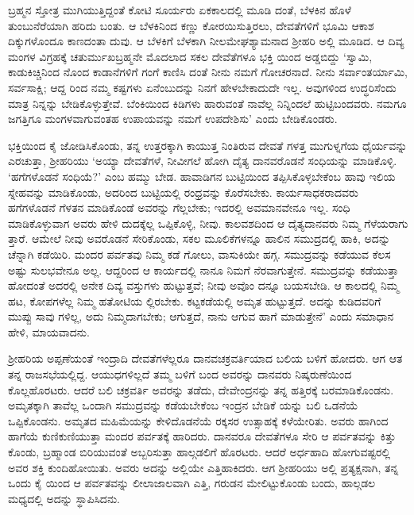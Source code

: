 ಬ್ರಹ್ಮನ ಸ್ತೋತ್ರ ಮುಗಿಯುತ್ತಿದ್ದಂತೆ ಕೋಟಿ ಸೂರ್ಯರು ಏಕಕಾಲದಲ್ಲಿ ಮೂಡಿ ದಂತೆ, ಬೆಳಕಿನ ಹೊಳೆ ತುಂಬುನೆರೆಯಾಗಿ ಹರಿದು ಬಂತು. ಆ ಬೆಳಕಿನಿಂದ ಕಣ್ಣು ಕೋರಯಿಸುತ್ತಿರಲು, ದೇವತೆಗಳಿಗೆ ಭೂಮಿ ಆಕಾಶ ದಿಕ್ಕುಗಳೊಂದೂ ಕಾಣದಂತಾ ದುವು. ಆ ಬೆಳಕಿಗೆ ಬೆಳಕಾಗಿ ನೀಲಮೇಘಶ್ಯಾಮನಾದ ಶ್ರೀಹರಿ ಅಲ್ಲಿ ಮೂಡಿದ. ಆ ದಿವ್ಯ ಮಂಗಳ ವಿಗ್ರಹಕ್ಕೆ ಚತುರ್ಮುಖಬ್ರಹ್ಮನೇ ಮೊದಲಾದ ಸಕಲ ದೇವೆತೆಗಳೂ ಭಕ್ತಿ ಯಿಂದ ಅಡ್ಡಬಿದ್ದು ‘ಸ್ವಾಮಿ, ಕಾಡುಕಿಚ್ಚಿನಿಂದ ನೊಂದ ಕಾಡಾನೆಗಳಿಗೆ ಗಂಗೆ ಕಾಣಿಸಿ ದಂತೆ ನೀನು ನಮಗೆ ಗೋಚರನಾದೆ. ನೀನು ಸರ್ವಾಂತರ್ಯಾಮಿ, ಸರ್ವಸಾಕ್ಷಿ; ಆದ್ದ ರಿಂದ ನಮ್ಮ ಕಷ್ಟಗಳು ಏನೆಂಬುದನ್ನು ನಿನಗೆ ಹೇಳಬೇಕಾದುದೇ ಇಲ್ಲ. ಅವುಗಳಿಂದ ಉದ್ಧರಿಸೆಂದು ಮಾತ್ರ ನಿನ್ನನ್ನು ಬೇಡಿಕೊಳ್ಳುತ್ತೇವೆ. ಬೆಂಕಿಯಿಂದ ಕಿಡಿಗಳು ಹಾರುವಂತೆ ನಾವೆಲ್ಲ ನಿನ್ನಿಂದಲೆ ಹುಟ್ಟಿಬಂದವರು. ನಮಗೂ ಜಗತ್ತಿಗೂ ಮಂಗಳವಾಗುವಂತಹ ಉಪಾಯವನ್ನು ನಮಗೆ ಉಪದೇಶಿಸು’ ಎಂದು ಬೇಡಿಕೊಂಡರು.

ಭಕ್ತಿಯಿಂದ ಕೈ ಜೋಡಿಸಿಕೊಂಡು, ತನ್ನ ಉತ್ತರಕ್ಕಾಗಿ ಕಾಯುತ್ತ ನಿಂತಿರುವ ದೇವತೆ ಗಳತ್ತ ಮುಗುಳ್ನಗೆಯ ಧೈರ್ಯವನ್ನು ಎರಚುತ್ತಾ, ಶ್ರೀಹರಿಯು ‘ಅಯ್ಯಾ ದೇವತೆಗಳೆ, ನೀವೀಗಲೆ ಹೋಗಿ ದೈತ್ಯ ದಾನವರೊಡನೆ ಸಂಧಿಯನ್ನು ಮಾಡಿಕೊಳ್ಳಿ. ‘ಹಗೆಗಳೊಡನೆ ಸಂಧಿಯೆ?’ ಎಂಬ ಹಮ್ಮು ಬೇಡ. ಹಾವಾಡಿಗನ ಬುಟ್ಟಿಯಿಂದ ತಪ್ಪಿಸಿಕೊಳ್ಳಬೇಕೆಂಬ ಹಾವು ಇಲಿಯ ಸ್ನೇಹವನ್ನು ಮಾಡಿಕೊಂಡು, ಅದರಿಂದ ಬುಟ್ಟಿಯಲ್ಲಿ ರಂಧ್ರವನ್ನು ಕೊರೆಸಬೇಕು. ಕಾರ್ಯಸಾಧಕರಾದವರು ಹಗೆಗಳೊಡನೆ ಗೆಳತನ ಮಾಡಿಕೊಂಡೆ ಅವರನ್ನು ಗೆಲ್ಲಬೇಕು; ಇದರಲ್ಲಿ ಅವಮಾನವೇನೂ ಇಲ್ಲ. ಸಂಧಿ ಮಾಡಿಕೊಳ್ಳುವಾಗ ಅವರು ಹೇಳಿ ದುದಕ್ಕೆಲ್ಲ ಒಪ್ಪಿಕೊಳ್ಳಿ, ನೀವು. ಕಾಲವಶದಿಂದ ಆ ದೈತ್ಯದಾನವರು ನಿಮ್ಮ ಗೆಳೆಯರಾಗು ತ್ತಾರೆ. ಆಮೇಲೆ ನೀವು ಅವರೊಡನೆ ಸೇರಿಕೊಂಡು, ಸಕಲ ಮೂಲಿಕೆಗಳನ್ನೂ ಹಾಲಿನ ಸಮುದ್ರದಲ್ಲಿ ಹಾಕಿ, ಅದನ್ನು ಚೆನ್ನಾಗಿ ಕಡೆಯಿರಿ. ಮಂದರ ಪರ್ವತವು ನಿಮ್ಮ ಕಡೆ ಗೋಲು, ವಾಸುಕಿಯೇ ಹಗ್ಗ. ಸಮುದ್ರವನ್ನು ಕಡೆಯುವ ಕೆಲಸ ಅಷ್ಟು ಸುಲಭವೇನೂ ಅಲ್ಲ. ಆದ್ದರಿಂದ ಆ ಕಾರ್ಯದಲ್ಲಿ ನಾನೂ ನಿಮಗೆ ನೆರವಾಗುತ್ತೇನೆ. ಸಮುದ್ರವನ್ನು ಕಡೆಯುತ್ತಾ ಹೋದಂತೆ ಅದರಲ್ಲಿ ಅನೇಕ ದಿವ್ಯ ವಸ್ತುಗಳು ಹುಟ್ಟುತ್ತವೆ; ನೀವು ಅವೊಂ ದನ್ನೂ ಬಯಸಬೇಡಿ. ಆ ಕಾಲದಲ್ಲಿ ನಿಮ್ಮ ಹಟ, ಕೋಪಗಳೆಲ್ಲ ನಿಮ್ಮ ಹತೋಟಿಯ ಲ್ಲಿರಬೇಕು. ಕಟ್ಟಕಡೆಯಲ್ಲಿ ಅಮೃತ ಹುಟ್ಟುತ್ತದೆ. ಅದನ್ನು ಕುಡಿದವರಿಗೆ ಮುಪ್ಪು ಸಾವು ಗಳಿಲ್ಲ, ಅದು ನಿಮ್ಮದಾಗಬೇಕು; ಆಗುತ್ತದೆ, ನಾನು ಆಗುವ ಹಾಗೆ ಮಾಡುತ್ತೇನೆ’ ಎಂದು ಸಮಾಧಾನ ಹೇಳಿ, ಮಾಯವಾದನು.

ಶ್ರೀಹರಿಯ ಅಪ್ಪಣೆಯಂತೆ ಇಂದ್ರಾದಿ ದೇವತೆಗಳೆಲ್ಲರೂ ದಾನವಚಕ್ರವರ್ತಿಯಾದ ಬಲಿಯ ಬಳಿಗೆ ಹೋದರು. ಆಗ ಆತ ತನ್ನ ರಾಜಸಭೆಯಲ್ಲಿದ್ದ. ಆಯುಧಗಳಿಲ್ಲದೆ ತಮ್ಮ ಬಳಿಗೆ ಬಂದ ಅವರನ್ನು ದಾನವರು ನಿಷ್ಕರುಣೆಯಿಂದ ಕೊಲ್ಲಹೊರಟರು. ಆದರೆ ಬಲಿ ಚಕ್ರವರ್ತಿ ಅವರನ್ನು ತಡೆದು, ದೇವೇಂದ್ರನನ್ನು ತನ್ನ ಹತ್ತಿರಕ್ಕೆ ಬರಮಾಡಿಕೊಂಡನು. ಅಮೃತಕ್ಕಾಗಿ ತಾವೆಲ್ಲ ಒಂದಾಗಿ ಸಮುದ್ರವನ್ನು ಕಡೆಯಬೇಕೆಂಬ ಇಂದ್ರನ ಬೇಡಿಕೆ ಯನ್ನು ಬಲಿ ಒಡನೆಯೆ ಒಪ್ಪಿಕೊಂಡನು. ಅಮೃತದ ಮಹಿಮೆಯನ್ನು ಕೇಳಿದೊಡನೆಯೆ ರಕ್ಕಸರ ಉತ್ಸಾಹಕ್ಕೆ ಕಳೆಯೇರಿತು. ಅವರು ಹಾಗಿಂದ ಹಾಗೆಯೆ ಕುಣಿಕುಣಿಯುತ್ತಾ ಮಂದರ ಪರ್ವತಕ್ಕೆ ಹಾರಿದರು. ದಾನವರೂ ದೇವತೆಗಳೂ ಸೇರಿ ಆ ಪರ್ವತವನ್ನು ಕಿತ್ತು ಕೊಂಡು, ಬ್ರಹ್ಮಾಂಡ ಬಿರಿಯುವಂತೆ ಅಬ್ಬರಿಸುತ್ತಾ ಹಾಲ್ಗಡಲಿಗೆ ಹೊರಟರು. ಆದರೆ ಅರ್ಧಹಾದಿ ಹೋಗುವಷ್ಟರಲ್ಲಿ ಅವರ ಶಕ್ತಿ ಕುಂದಿಹೋಯಿತು. ಅವರು ಅದನ್ನು ಅಲ್ಲಿಯೇ ಎತ್ತಿಹಾಕಿದರು. ಆಗ ಶ್ರೀಹರಿಯು ಅಲ್ಲಿ ಪ್ರತ್ಯಕ್ಷನಾಗಿ, ತನ್ನ ಒಂದು ಕೈ ಯಿಂದ ಆ ಪರ್ವತವನ್ನು ಲೀಲಾಜಾಲವಾಗಿ ಎತ್ತಿ, ಗರುಡನ ಮೇಲಿಟ್ಟುಕೊಂಡು ಬಂದು, ಹಾಲ್ಗಡಲ ಮಧ್ಯದಲ್ಲಿ ಅದನ್ನು ಸ್ಥಾಪಿಸಿದನು. 

